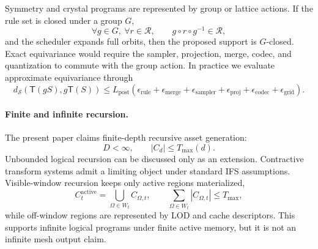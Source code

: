 Symmetry and crystal programs are represented by group or lattice actions. If the rule set is closed under a group \(G\),
\begin{equation}
\forall g\in G,\ \forall r\in\mathcal{R},\qquad g\circ r\circ g^{-1}\in\mathcal{R},
\end{equation}
and the scheduler expands full orbits, then the proposed support is \(G\)-closed. Exact equivariance would require the sampler, projection, merge, codec, and quantization to commute with the group action. In practice we evaluate approximate equivariance through
\begin{equation}
d_{\mathcal{S}}(\mathsf{T}(gS),g\mathsf{T}(S))
\leq
L_{\mathrm{post}}
(\epsilon_{\mathrm{rule}}+\epsilon_{\mathrm{merge}}
+\epsilon_{\mathrm{sampler}}+\epsilon_{\mathrm{proj}}
+\epsilon_{\mathrm{codec}}+\epsilon_{\mathrm{grid}}).
\end{equation}

\paragraph{Finite and infinite recursion.}
The present paper claims finite-depth recursive asset generation:
\begin{equation}
D<\infty,\qquad |C_d|\leq T_{\max}(d).
\end{equation}
Unbounded logical recursion can be discussed only as an extension. Contractive transform systems admit a limiting object under standard IFS assumptions. Visible-window recursion keeps only active regions materialized,
\begin{equation}
C_t^{\mathrm{active}}=\bigcup_{\Omega\in W_t}C_{\Omega,t},
\qquad
\sum_{\Omega\in W_t}|C_{\Omega,t}|\leq T_{\max},
\end{equation}
while off-window regions are represented by LOD and cache descriptors. This supports infinite logical programs under finite active memory, but it is not an infinite mesh output claim.
